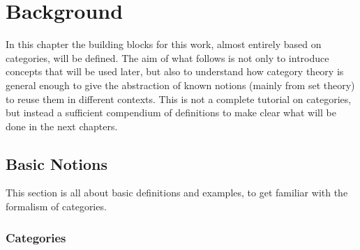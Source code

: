 \documentclass[a4paper, twoside,openright]{report}
\theoremstyle{plain}
\theoremstyle{definition}
\begin{document}
\newcommand{\cat}[1]{\mathscr{#1}}
\newcommand{\Ob}{\mathcal{O}b}
\newcommand{\Hom}{\mathcal{H}om}
\newcommand{\Set}{\mathbf{Set}}
\newcommand{\Reg}{\mathcal{R}eg}
\newcommand{\Mono}{\mathcal{M}ono}
\newcommand{\initial}{\mymathbb{0}}
\newcommand{\terminal}{\mathds{1}}
\newcommand{\eqgraph}[1]{\mathbb{#1}}
\newcommand{\Egg}{\mathbf{EGG}}

% 

\tableofcontents



\chapter{Background}
In this chapter the building blocks for this work, almost entirely based on categories, will be defined.
The aim of what follows is not only to introduce concepts that will be used later, but also to understand how category theory is general enough to give the abstraction of known notions (mainly from set theory) to reuse them in different contexts. This is not a complete tutorial on categories, but instead a sufficient compendium of definitions to make clear what will be done in the next chapters.

\section{Basic Notions}\label{sect:basic_nots}


This section is all about basic definitions and examples, to get familiar with the formalism of categories.

\subsection{Categories}\label{ssect:cats}
\end{document}
